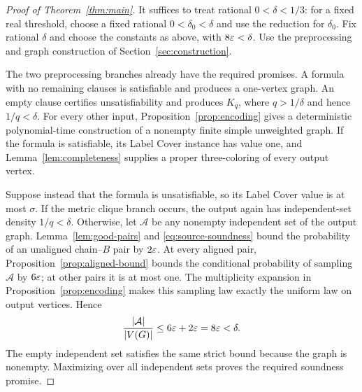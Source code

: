 \begin{proof}[Proof of Theorem~\ref{thm:main}]
It suffices to treat rational $0<\delta<1/3$: for a fixed real
threshold, choose a fixed rational $0<\delta_0<\delta$ and use the
reduction for $\delta_0$.
Fix rational $\delta$ and choose the constants as above, with
$8\varepsilon<\delta$. Use the preprocessing and graph construction of
Section~\ref{sec:construction}.

The two preprocessing branches already have the required promises.
A formula with no remaining clauses is satisfiable and produces a
one-vertex graph. An empty clause certifies unsatisfiability and
produces $K_q$, where $q>1/\delta$ and hence $1/q<\delta$.
For every other input, Proposition~\ref{prop:encoding} gives a
deterministic polynomial-time construction of a nonempty finite simple
unweighted graph. If the formula is satisfiable, its Label Cover
instance has value one, and Lemma~\ref{lem:completeness} supplies a
proper three-coloring of every output vertex.

Suppose instead that the formula is unsatisfiable, so its Label Cover
value is at most $\sigma$. If the metric clique branch occurs, the
output again has independent-set density $1/q<\delta$.
Otherwise, let $\mathcal A$ be any nonempty independent set of the
output graph. Lemma~\ref{lem:good-pairs} and
\eqref{eq:source-soundness} bound the probability of an unaligned
chain--$B$ pair by $2\varepsilon$.
At every aligned pair, Proposition~\ref{prop:aligned-bound} bounds
the conditional probability of sampling $\mathcal A$ by $6\varepsilon$;
at other pairs it is at most one. The multiplicity expansion in
Proposition~\ref{prop:encoding} makes this sampling law exactly the
uniform law on output vertices. Hence
\[
 \frac{|\mathcal A|}{|V(G)|}
 \le 6\varepsilon+2\varepsilon
 =8\varepsilon<\delta.
\]
The empty independent set satisfies the same strict bound because
the graph is nonempty. Maximizing over all independent sets proves
the required soundness promise.
\end{proof}
